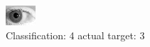 \begin{figure}[h!]
\begin{center}
\includegraphics[width=0.60\columnwidth]{figures/ID209_class_4_target_3.png}
\end{center}
\caption{ Classification: 4 actual target: 3}
\label{fig:ID209_class_4_target_3}
\end{figure}
